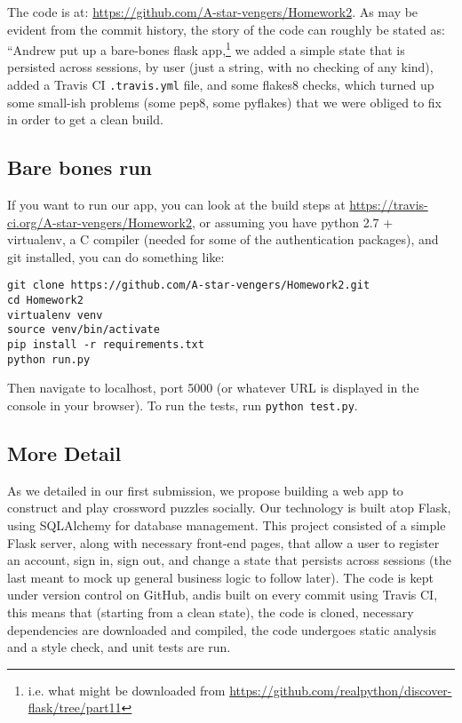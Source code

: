 \documentclass[10pt]{article}
\theoremstyle{remark}
\numberwithin{equation}{section}
\begin{document}
The code is at: \url{https://github.com/A-star-vengers/Homework2}. As may be evident from the commit history, the story of the code can roughly be stated as: ``Andrew put up a bare-bones flask app,\footnote{i.e. what might be downloaded from \url{https://github.com/realpython/discover-flask/tree/part11}} we added a simple state that is persisted across sessions, by user (just a string, with no checking of any kind), added a Travis CI \texttt{.travis.yml} file, and some flakes8 checks, which turned up some small-ish problems (some pep8, some pyflakes) that we were obliged to fix in order to get a clean build. 

\subsection{Bare bones run} 

If you want to run our app, you can look at the build steps at \url{https://travis-ci.org/A-star-vengers/Homework2}, or assuming you have python 2.7 + virtualenv, a C compiler (needed for some of the authentication packages), and git installed, you can do something like:

\begin{verbatim} 
git clone https://github.com/A-star-vengers/Homework2.git
cd Homework2
virtualenv venv
source venv/bin/activate
pip install -r requirements.txt
python run.py
\end{verbatim} 

Then navigate to localhost, port 5000 (or whatever URL is displayed in the console in your browser). To run the tests, run \texttt{python test.py}.

\subsection{More Detail}
As we detailed in our first submission, we propose building a web app to construct and play crossword puzzles socially. Our technology is built atop Flask, using SQLAlchemy for database management. This project consisted of a simple Flask server, along with necessary front-end pages, that allow a user to register an account, sign in, sign out, and change a state that persists across sessions (the last meant to mock up general business logic to follow later). The code is kept under version control on GitHub, andis built on every commit using Travis CI, this means that (starting from a clean state), the code is cloned, necessary dependencies are downloaded and compiled, the code undergoes static analysis and a style check, and unit tests are run. 
\end{document}
